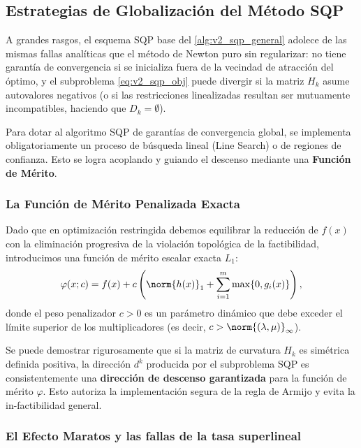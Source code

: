 \subsection{Estrategias de Globalización del Método SQP}

A grandes rasgos, el esquema SQP base del \cref{alg:v2_sqp_general} adolece de las mismas fallas analíticas que el método de Newton puro sin regularizar: no tiene garantía de convergencia si se inicializa fuera de la vecindad de atracción del óptimo, y el subproblema \eqref{eq:v2_sqp_obj} puede divergir si la matriz $H_k$ asume autovalores negativos (o si las restricciones linealizadas resultan ser mutuamente incompatibles, haciendo que $D_k = \emptyset$).

Para dotar al algoritmo SQP de garantías de convergencia global, se implementa obligatoriamente un proceso de búsqueda lineal (Line Search) o de regiones de confianza. Esto se logra acoplando y guiando el descenso mediante una \textbf{Función de Mérito}.

\subsubsection{La Función de Mérito Penalizada Exacta}

Dado que en optimización restringida debemos equilibrar la reducción de $f(x)$ con la eliminación progresiva de la violación topológica de la factibilidad, introducimos una función de mérito escalar exacta $L_1$:
\begin{equation}
    \varphi(x; c) = f(x) + c \left( \norm{h(x)}_1 + \sum_{i=1}^m \max\{0, g_i(x)\} \right),
    \label{eq:v2_merito_L1_sqp}
\end{equation}
donde el peso penalizador $c > 0$ es un parámetro dinámico que debe exceder el límite superior de los multiplicadores (es decir, $c > \norm{(\lambda, \mu)}_\infty$). 

Se puede demostrar rigurosamente que si la matriz de curvatura $H_k$ es simétrica definida positiva, la dirección $d^k$ producida por el subproblema SQP es consistentemente una \textbf{dirección de descenso garantizada} para la función de mérito $\varphi$. Esto autoriza la implementación segura de la regla de Armijo y evita la in-factibilidad general.

\subsubsection{El Efecto Maratos y las fallas de la tasa superlineal}

